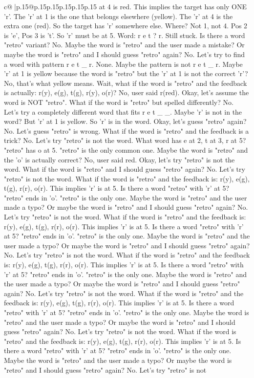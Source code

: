 \documentclass{article}
\begin{document}
{\begin{supertabular}{c@{$\;$}|p{.15\linewidth}@{}p{.15\linewidth}p{.15\linewidth}p{.15\linewidth}p{.15\linewidth}p{.15\linewidth}}
{{{at 4 is red. This implies the target has only ONE 'r'. The 'r' at 1 is the one that belongs elsewhere (yellow). The 'r' at 4 is the extra one (red). So the target has 'r' somewhere else. Where? Not 1, not 4. Pos 2 is 'e', Pos 3 is 't'. So 'r' must be at 5. Word: r e t ? r. Still stuck. Is there a word "retro" variant? No. Maybe the word is "retro" and the user made a mistake? Or maybe the word is "retro" and I should guess "retro" again? No. Let's try to find a word with pattern r e t \_ r. None. Maybe the pattern is not r e t \_ r. Maybe 'r' at 1 is yellow because the word is "retro" but the 'r' at 1 is not the correct 'r'? No, that's what yellow means. Wait, what if the word is "retro" and the feedback is actually: r(y), e(g), t(g), r(y), o(r)? No, user said r(red). Okay, let's assume the word is NOT "retro". What if the word is "retro" but spelled differently? No. Let's try a completely different word that fits r e t \_ \_. Maybe 'r' is not in the word? But 'r' at 1 is yellow. So 'r' is in the word. Okay, let's guess "retro" again? No. Let's guess "retro" is wrong. What if the word is "retro" and the feedback is a trick? No. Let's try "retro" is not the word. What word has e at 2, t at 3, r at 5? "retro" has o at 5. "retro" is the only common one. Maybe the word is "retro" and the 'o' is actually correct? No, user said red. Okay, let's try "retro" is not the word. What if the word is "retro" and I should guess "retro" again? No. Let's try "retro" is not the word. What if the word is "retro" and the feedback is: r(y), e(g), t(g), r(r), o(r). This implies 'r' is at 5. Is there a word "retro" with 'r' at 5? "retro" ends in 'o'. "retro" is the only one. Maybe the word is "retro" and the user made a typo? Or maybe the word is "retro" and I should guess "retro" again? No. Let's try "retro" is not the word. What if the word is "retro" and the feedback is: r(y), e(g), t(g), r(r), o(r). This implies 'r' is at 5. Is there a word "retro" with 'r' at 5? "retro" ends in 'o'. "retro" is the only one. Maybe the word is "retro" and the user made a typo? Or maybe the word is "retro" and I should guess "retro" again? No. Let's try "retro" is not the word. What if the word is "retro" and the feedback is: r(y), e(g), t(g), r(r), o(r). This implies 'r' is at 5. Is there a word "retro" with 'r' at 5? "retro" ends in 'o'. "retro" is the only one. Maybe the word is "retro" and the user made a typo? Or maybe the word is "retro" and I should guess "retro" again? No. Let's try "retro" is not the word. What if the word is "retro" and the feedback is: r(y), e(g), t(g), r(r), o(r). This implies 'r' is at 5. Is there a word "retro" with 'r' at 5? "retro" ends in 'o'. "retro" is the only one. Maybe the word is "retro" and the user made a typo? Or maybe the word is "retro" and I should guess "retro" again? No. Let's try "retro" is not the word. What if the word is "retro" and the feedback is: r(y), e(g), t(g), r(r), o(r). This implies 'r' is at 5. Is there a word "retro" with 'r' at 5? "retro" ends in 'o'. "retro" is the only one. Maybe the word is "retro" and the user made a typo? Or maybe the word is "retro" and I should guess "retro" again? No. Let's try "retro" is not }}}
\end{supertabular}}
\end{document}
